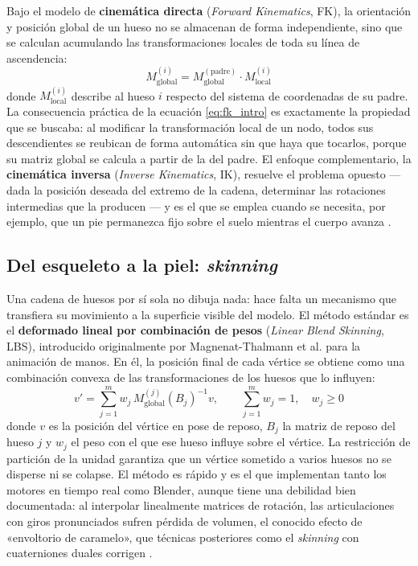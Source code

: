 Bajo el modelo de \textbf{cinemática directa} (\textit{Forward Kinematics}, FK), la orientación y posición global de un hueso no se almacenan de forma independiente, sino que se calculan acumulando las transformaciones locales de toda su línea de ascendencia:
\begin{equation}
    M_{\text{global}}^{(i)} = M_{\text{global}}^{(\text{padre})} \cdot M_{\text{local}}^{(i)}
    \label{eq:fk_intro}
\end{equation}
donde $M_{\text{local}}^{(i)}$ describe al hueso $i$ respecto del sistema de coordenadas de su padre. La consecuencia práctica de la ecuación \eqref{eq:fk_intro} es exactamente la propiedad que se buscaba: al modificar la transformación local de un nodo, todos sus descendientes se reubican de forma automática sin que haya que tocarlos, porque su matriz global se calcula a partir de la del padre. El enfoque complementario, la \textbf{cinemática inversa} (\textit{Inverse Kinematics}, IK), resuelve el problema opuesto --- dada la posición deseada del extremo de la cadena, determinar las rotaciones intermedias que la producen --- y es el que se emplea cuando se necesita, por ejemplo, que un pie permanezca fijo sobre el suelo mientras el cuerpo avanza \cite{parent2012}.

\subsection{Del esqueleto a la piel: \textit{skinning}}

Una cadena de huesos por sí sola no dibuja nada: hace falta un mecanismo que transfiera su movimiento a la superficie visible del modelo. El método estándar es el \textbf{deformado lineal por combinación de pesos} (\textit{Linear Blend Skinning}, LBS), introducido originalmente por Magnenat-Thalmann et al. \cite{magnenat1988} para la animación de manos. En él, la posición final de cada vértice se obtiene como una combinación convexa de las transformaciones de los huesos que lo influyen:
\begin{equation}
    v' = \sum_{j=1}^{m} w_j \, M_{\text{global}}^{(j)} \left(B_j\right)^{-1} v,
    \qquad \sum_{j=1}^{m} w_j = 1, \quad w_j \ge 0
    \label{eq:lbs_intro}
\end{equation}
donde $v$ es la posición del vértice en pose de reposo, $B_j$ la matriz de reposo del hueso $j$ y $w_j$ el peso con el que ese hueso influye sobre el vértice. La restricción de partición de la unidad garantiza que un vértice sometido a varios huesos no se disperse ni se colapse. El método es rápido y es el que implementan tanto los motores en tiempo real como Blender, aunque tiene una debilidad bien documentada: al interpolar linealmente matrices de rotación, las articulaciones con giros pronunciados sufren pérdida de volumen, el conocido efecto de «envoltorio de caramelo», que técnicas posteriores como el \textit{skinning} con cuaterniones duales corrigen \cite{kavan2007}.

